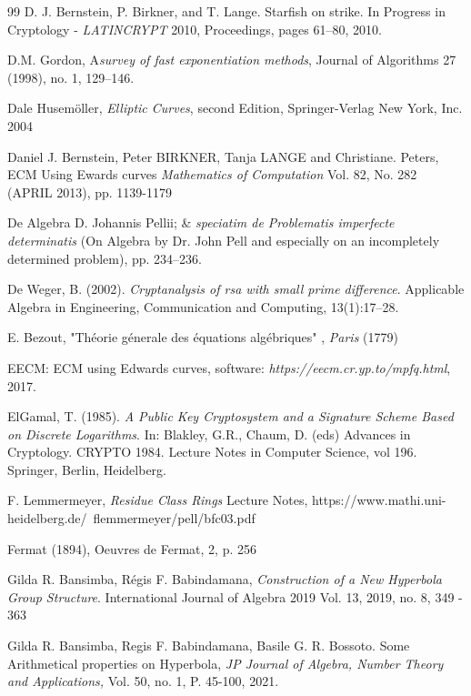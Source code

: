 \documentclass[sigconf,balance=false]{acmart}
\begin{document}
\begin{thebibliography}{99}
 D. J. Bernstein, P. Birkner, and T. Lange. Starfish on strike. In Progress in Cryptology - \emph{LATINCRYPT} 2010, Proceedings, pages 61--80, 2010.

 D.M. Gordon, A\emph{survey of fast exponentiation methods}, Journal of Algorithms 27 (1998), no. 1, 129–146.

 Dale Husemöller, \emph{Elliptic Curves}, second Edition, Springer-Verlag New York, Inc. 2004

 Daniel J. Bernstein, Peter BIRKNER, Tanja LANGE and Christiane. Peters, ECM Using Ewards curves \emph{Mathematics of Computation} Vol. 82, No. 282 (APRIL 2013), pp. 1139-1179

 De Algebra D. Johannis Pellii; \& \emph{speciatim de Problematis imperfecte determinatis} (On Algebra by Dr. John Pell and especially on an incompletely determined problem), pp. 234–236.

 De Weger, B. (2002). \emph{Cryptanalysis of rsa with small prime difference}. Applicable Algebra in Engineering, Communication and Computing, 13(1):17–28.


 E. Bezout, "Théorie génerale des équations algébriques" , \emph{Paris} (1779)

 EECM: ECM using Edwards curves, software: \emph{https://eecm.cr.yp.to/mpfq.html}, 2017.

 ElGamal, T. (1985). \emph{A Public Key Cryptosystem and a Signature Scheme Based on Discrete Logarithms}. In: Blakley, G.R., Chaum, D. (eds) Advances in Cryptology. CRYPTO 1984. Lecture Notes in Computer Science, vol 196. Springer, Berlin, Heidelberg.

 F. Lemmermeyer, \emph{Residue Class Rings} Lecture Notes, https://www.mathi.uni-heidelberg.de/~flemmermeyer/pell/bfc03.pdf

 Fermat (1894), Oeuvres de Fermat, 2, p. 256



 Gilda R. Bansimba,  Régis F. Babindamana, \emph{Construction of a New Hyperbola Group Structure}. International Journal of Algebra 2019 Vol. 13, 2019, no. 8, 349 - 363

 Gilda R. Bansimba, Regis F. Babindamana, Basile G. R. Bossoto. Some Arithmetical properties on Hyperbola, \emph{JP Journal of Algebra, Number Theory and Applications,} Vol. 50, no. 1, P. 45-100, 2021.


\end{thebibliography}
\end{document}

